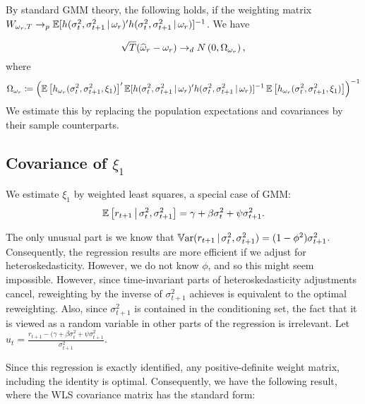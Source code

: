 \documentclass[11pt, letterpaper, twoside]{article}
\begin{document}
By standard GMM theory, the following holds, if the weighting matrix \newline $W_{\omega_r,T} \to_p \operatorname{\mathbb{E}}[h(\sigma^2_t,
\sigma^2_{t+1} \,\vert\, \omega_r)' h(\sigma^2_t, \sigma^2_{t+1} \,\vert\, \omega_r)]^{-1}$.
We have 

\begin{equation}
  \sqrt{T}(\widehat{\omega}_r - \omega_r) \to_d N\left(0, \Omega_{\omega_r}\right),
\end{equation}
%
where
%
\begin{equation}
  \Omega_{\omega_r} \coloneqq \left(\operatorname{\mathbb{E}}\left[h_{\omega_r}(\sigma^2_{t}, \sigma^2_{t+1}, \xi_{1})\right]'
  \operatorname{\mathbb{E}}[h(\sigma^2_t, \sigma^2_{t+1} \,\vert\, \omega_r)' h(\sigma^2_t, \sigma^2_{t+1} \,\vert\, \omega_r)]^{-1}
  \operatorname{\mathbb{E}}\left[h_{\omega_r}(\sigma^2_{t}, \sigma^2_{t+1}, \xi_{1})\right]\right)^{-1}
\end{equation}
%
We estimate this by replacing the population expectations and covariances by their sample counterparts.

\subsection[Covariance Computation Step 2]{Covariance of $\xi_1$}\label{sec:est_xi2}

We estimate $\xi_1$ by weighted least squares, a special case of GMM: 
%
\begin{equation}
  \operatorname{\mathbb{E}}\left[r_{t+1} \,\middle\vert\, \sigma^2_t, \sigma^2_{t+1}\right] = \gamma + \beta \sigma^2_t + \psi \sigma^2_{t+1}.
\end{equation}

The only unusual part is we know that $\operatorname{\mathbb{V}ar}(r_{t+1} \,\vert\, \sigma^2_t, \sigma^2_{t+1}) = (1-\phi^2) \sigma^2_{t+1}$. Consequently, the regression results are more efficient if we adjust for heteroskedasticity. However, we do not know $\phi$, and so this might seem impossible. However, since time-invariant parts of heteroskedasticity adjustments cancel, reweighting by the inverse of $\sigma^2_{t+1}$ achieves is equivalent to the optimal reweighting. Also, since $\sigma^2_{t+1}$ is contained in the conditioning set, the fact that it is viewed as a random variable in other parts of the regression is irrelevant. Let $u_t = \frac{r_{t+1} - (\gamma + \beta \sigma^2_{t} + \psi \sigma^2_{t+1}}{\sigma^2_{t+1}}$.

Since this regression is exactly identified, any positive-definite weight matrix, including the identity is optimal. Consequently, we have the following result, where the WLS covariance matrix has the standard form:
\end{document}
